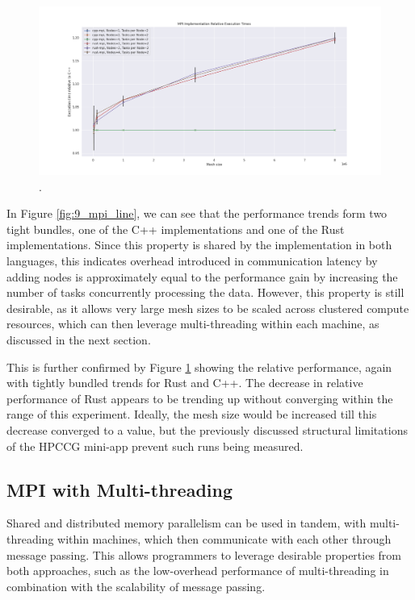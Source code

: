 \begin{figure}[H]
    \centering
    \includegraphics[width=\textwidth]{images/5_performance/parallelism/10_mpi_line_relative.png}
    \caption{.}
    \label{fig:10_mpi_line_relative}
\end{figure}

In Figure \ref{fig:9_mpi_line}, we can see that the performance trends form two tight bundles, one of the C++ implementations and one of the Rust implementations. Since this property is shared by the implementation in both languages, this indicates overhead introduced in communication latency by adding nodes is approximately equal to the performance gain by increasing the number of tasks concurrently processing the data. However, this property is still desirable, as it allows very large mesh sizes to be scaled across clustered compute resources, which can then leverage multi-threading within each machine, as discussed in the next section.

This is further confirmed by Figure \ref{fig:10_mpi_line_relative} showing the relative performance, again with tightly bundled trends for Rust and C++. The decrease in relative performance of Rust appears to be trending up without converging within the range of this experiment. Ideally, the mesh size would be increased till this decrease converged to a value, but the previously discussed structural limitations of the HPCCG mini-app prevent such runs being measured.


\subsection{MPI with Multi-threading}
\label{ssec:mpi-multithreading}

Shared and distributed memory parallelism can be used in tandem, with multi-threading within machines, which then communicate with each other through message passing. This allows programmers to leverage desirable properties from both approaches, such as the low-overhead performance of multi-threading in combination with the scalability of message passing.

